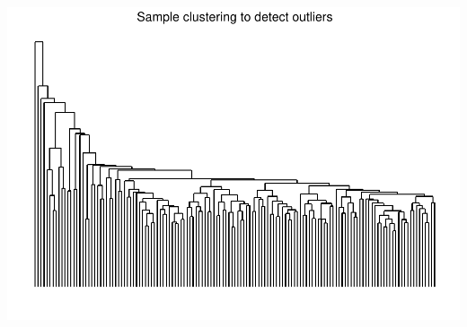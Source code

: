 \documentclass[]{article}
\begin{document}
\includegraphics{wgcna_demo_files/figure-latex/clustering samples-1.pdf}
\end{document}
